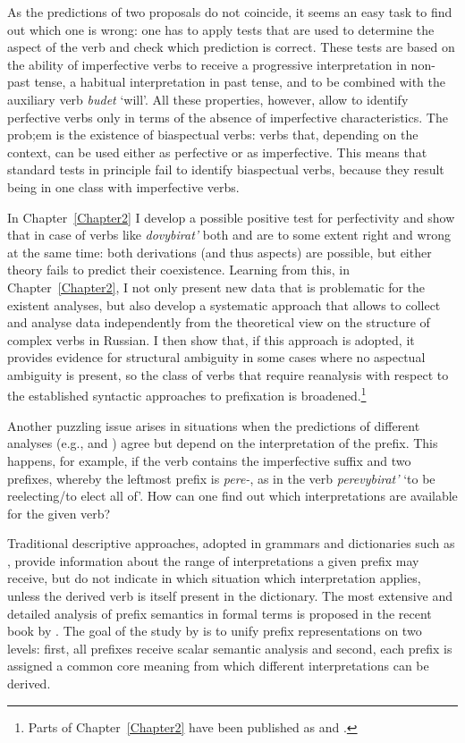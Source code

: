 As the predictions of two proposals do not coincide, it seems an easy task to find out which one is wrong: one has to apply tests that are used to determine the aspect of the verb and check which prediction is correct. These tests are based on the ability of imperfective verbs to receive a progressive interpretation in non-past tense, a habitual interpretation in past tense, and to be combined with the auxiliary verb \textit{budet} `will'. All these properties, however, allow to identify perfective verbs only in terms of the absence of imperfective characteristics. The prob;em is the existence of biaspectual verbs: verbs that, depending on the context, can be used either as perfective or as imperfective. This means that standard tests in principle fail to identify biaspectual verbs, because they result being in one class with imperfective verbs.

In Chapter~\ref{Chapter2} I develop a possible positive test for perfectivity and show that in case of verbs like \textit{dovybirat'} both \citet{Svenonius:04b} and \citet{Tatevosov:07} are to some extent right and wrong at the same time: both derivations (and thus aspects) are possible, but either theory fails to predict their coexistence. Learning from this, in Chapter~\ref{Chapter2}, I not only present new data that is problematic for the existent analyses, but also develop a systematic approach that allows to collect and analyse data independently from the theoretical view on the structure of complex verbs in Russian. I then show that, if this approach is adopted, it provides evidence for structural ambiguity in some cases where no aspectual ambiguity is present, so the class of verbs that require reanalysis with respect to the established syntactic approaches to prefixation is broadened.\footnote{Parts of Chapter~\ref{Chapter2} have been published as \citealt{ZinovaFilip:13} and \citealt{ZinovaOsswald:paper}.}

Another puzzling issue arises in situations when the predictions of different analyses (e.g., \citealt{Svenonius:04b} and \citealt{Tatevosov:07}) agree but depend on the interpretation of the prefix. This happens, for example, if the verb contains the imperfective suffix and two prefixes, whereby the leftmost prefix is \textit{pere-}, as in the verb \textit{perevybirat'} `to be reelecting/to elect all of'. How can one find out which interpretations are available for the given verb? 

\hspace*{-0.64717pt}Traditional descriptive approaches, adopted in grammars and dictionaries such as \citet{Shvedova:82}, provide information about the range of interpretations a given prefix may receive, but do not indicate in which situation which interpretation applies, unless the derived verb is itself present in the dictionary. The most extensive and detailed analysis of prefix semantics in formal terms is proposed in the recent book by \citet{Kagan:book}. The goal of the study by \citet{Kagan:book} is to unify prefix representations on two levels: first, all prefixes receive scalar semantic analysis and second, each prefix is assigned a common core meaning from which different interpretations can be derived. 

